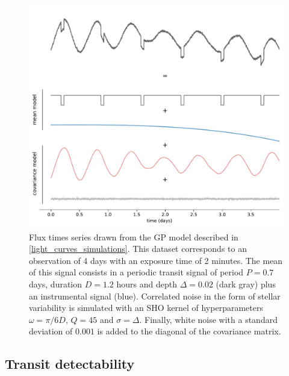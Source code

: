 \documentclass[modern]{aastex631}
\begin{document}
\begin{figure}[H]
    \begin{centering}
        \includegraphics[width=\linewidth]{../workflows/principle/figures/principle_dataset_decomposed.pdf}
        \caption{Flux times series drawn from the GP model described in \autoref{light_curves_simulations}. This dataset corresponds to an observation of 4 days with an exposure time of 2 minutes. The mean of this signal consists in a periodic transit signal of period $P=0.7$ days, duration $D=1.2$ hours and depth $\Delta=0.02$ (dark gray) plus an instrumental signal (blue). Correlated noise in the form of stellar variability is simulated with an SHO kernel of hyperparameters $\omega = \pi / 6 D$, $Q=45$ and $\sigma = \Delta$. Finally, white noise with a standard deviation of $0.001$ is added to the diagonal of the covariance matrix.}
        \label{fig:app_principle_dataset}
    \end{centering}
\end{figure}


\subsection{Transit detectability}\label{transit_detectability}
\end{document}
